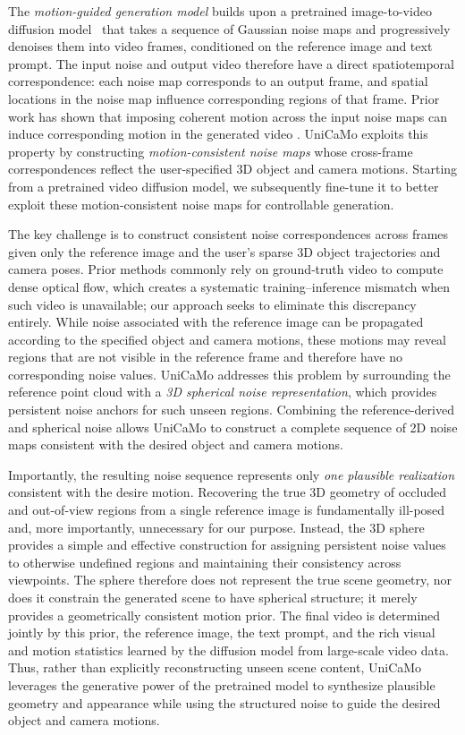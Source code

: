 \ifdefined\arxivbuild\else\documentclass{article}\fi %
\begin{document}
The \emph{motion-guided generation model} builds upon a pretrained image-to-video diffusion model~\citep{wanvideo} that takes a sequence of Gaussian noise maps and progressively denoises them into video frames, conditioned on the reference image and text prompt. The input noise and output video therefore have a direct spatiotemporal correspondence: each noise map corresponds to an output frame, and spatial locations in the noise map influence corresponding regions of that frame. Prior work has shown that imposing coherent motion across the input noise maps can induce corresponding motion in the generated video \cite{burgert2025go, liu2025equivdm}. UniCaMo exploits this property by constructing \emph{motion-consistent noise maps} whose cross-frame correspondences reflect the user-specified 3D object and camera motions. Starting from a pretrained video diffusion model, we subsequently fine-tune it to better exploit these motion-consistent noise maps for controllable generation.

The key challenge is to construct consistent noise correspondences across frames given only the reference image and the user’s sparse 3D object trajectories and camera poses. Prior methods \citep{burgert2025go, liu2025equivdm} commonly rely on ground‑truth video to compute dense optical flow, which creates a systematic training–inference mismatch when such video is unavailable; our approach seeks to eliminate this discrepancy entirely. While noise associated with the reference image can be propagated according to the specified object and camera motions, these motions may reveal regions that are not visible in the reference frame and therefore have no corresponding noise values. UniCaMo addresses this problem by surrounding the reference point cloud with a \emph{3D spherical noise representation}, which provides persistent noise anchors for such unseen regions. Combining the reference-derived and spherical noise allows UniCaMo to construct a complete sequence of 2D noise maps consistent with the desired object and camera motions.

Importantly, the resulting noise sequence represents only \emph{one plausible realization} consistent with the desire motion. Recovering the true 3D geometry of occluded and out-of-view regions from a single reference image is fundamentally ill-posed and, more importantly, unnecessary for our purpose. Instead, the 3D sphere provides a simple and effective construction for assigning persistent noise values to otherwise undefined regions and maintaining their consistency across viewpoints. The sphere therefore does not represent the true scene geometry, nor does it constrain the generated scene to have spherical structure; it merely provides a geometrically consistent motion prior. The final video is determined jointly by this prior, the reference image, the text prompt, and the rich visual and motion statistics learned by the diffusion model from large-scale video data. Thus, rather than explicitly reconstructing unseen scene content, UniCaMo leverages the generative power of the pretrained model to synthesize plausible geometry and appearance while using the structured noise to guide the desired object and camera motions.
\end{document}
